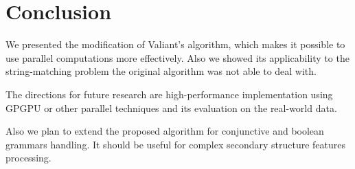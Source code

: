 \section{\bf Conclusion}

We presented the modification of Valiant's algorithm, which makes it possible to use parallel computations more effectively. 
Also we showed its applicability to the string-matching problem the original algorithm was not able to deal with.

The directions for future research are high-performance implementation using GPGPU or other parallel techniques and its evaluation on the real-world data.

Also we plan to extend the proposed algorithm for conjunctive and boolean grammars handling. It should be useful for complex secondary structure features processing.
